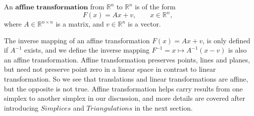       \begin{definition*}
      An $\textbf{affine transformation}$ from $\mathbb{R}^n$ to $\mathbb{R}^n$ is of the form
      \begin{equation*}
      {F}(x) = {Ax} + {v}, \qquad {x}\in\mathbb{R}^n,
      \end{equation*}
      where ${A}\in\mathbb{R}^{n\times n}$ is a matrix, and  ${v}\in\mathbb{R}^n$ is a vector.
      \end{definition*}
      The inverse mapping of an affine transformation $F(x) = Ax + v$, is only defined if $A^{-1}$ exists, and we define the inverse mapping $F^{-1} = {x} \mapsto {A}^{-1}({x} - {v})$ is also an affine transformation.
      Affine transformation preserves points, lines and planes, but need not preserve point zero in a linear space in contrast to linear transformation. So we see that translations and linear transformations are affine, but the opposite is not true. Affine transformation helps carry results from one simplex to another simplex in our discussion, and more details are covered after introducing ${Simplices}$ and ${Triangulations}$ in the next section.


